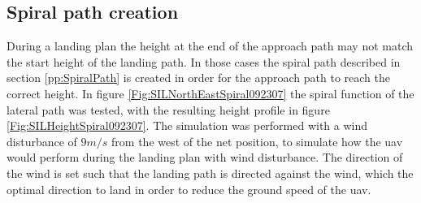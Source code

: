 \subsection{Spiral path creation}
During a landing plan the height at the end of the approach path may not match the start height of the landing path. In those cases the spiral path described in section \ref{pp:SpiralPath} is created in order for the approach path to reach the correct height. In figure \ref{Fig:SILNorthEastSpiral092307} the spiral function of the lateral path was tested, with the resulting height profile in figure \ref{Fig:SILHeightSpiral092307}. The simulation was performed with a wind disturbance of $9 m/s$ from the west of the net position, to simulate how the \gls{uav} would perform during the landing plan with wind disturbance. The direction of the wind is set such that the landing path is directed against the wind, which the optimal direction to land in order to reduce the ground speed of the \gls{uav}. 

